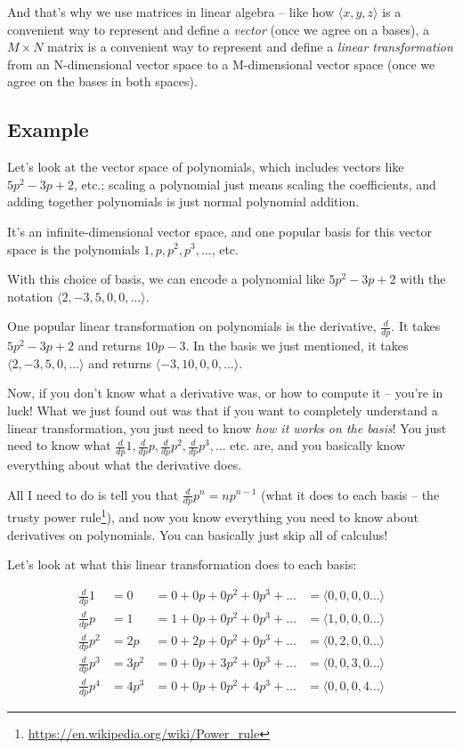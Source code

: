 \documentclass[]{article}
\renewcommand{\href}[2]{#2\footnote{\url{#1}}}
\begin{document}
And that's why we use matrices in linear algebra -- like how \(\langle x, y, z
\rangle\) is a convenient way to represent and define a \emph{vector} (once we
agree on a bases), a \(M \times N\) matrix is a convenient way to represent and
define a \emph{linear transformation} from an N-dimensional vector space to a
M-dimensional vector space (once we agree on the bases in both spaces).

\subsection{Example}\label{example}

Let's look at the vector space of polynomials, which includes vectors like \(5
p^2 - 3 p + 2\), etc.; scaling a polynomial just means scaling the coefficients,
and adding together polynomials is just normal polynomial addition.

It's an infinite-dimensional vector space, and one popular basis for this vector
space is the polynomials \(1, p, p^2, p^3, \ldots\), etc.

With this choice of basis, we can encode a polynomial like \(5 p^2 - 3 p + 2\)
with the notation \(\langle 2, -3, 5, 0, 0, \ldots \rangle\).

One popular linear transformation on polynomials is the derivative,
\(\frac{d}{dp}\). It takes \(5 p^2 - 3 p + 2\) and returns \(10 p - 3\). In the
basis we just mentioned, it takes \(\langle 2, -3, 5, 0, \ldots \rangle\) and
returns \(\langle -3, 10, 0, 0, \ldots \rangle\).

Now, if you don't know what a derivative was, or how to compute it -- you're in
luck! What we just found out was that if you want to completely understand a
linear transformation, you just need to know \emph{how it works on the basis}!
You just need to know what \(\frac{d}{dp} 1, \frac{d}{dp} p, \frac{d}{dp} p^2,
\frac{d}{dp} p^3, \ldots\) etc. are, and you basically know everything about
what the derivative does.

All I need to do is tell you that \(\frac{d}{dp} p^n = n p^{n - 1}\) (what it
does to each basis -- the trusty
\href{https://en.wikipedia.org/wiki/Power_rule}{power rule}), and now you know
everything you need to know about derivatives on polynomials. You can basically
just skip all of calculus!

Let's look at what this linear transformation does to each basis:

\[
\begin{aligned}
\frac{d}{dp} 1   & = 0     & = 0 + 0 p + 0 p^2 + 0 p^3 + \ldots
    & = \langle 0, 0, 0, 0 \ldots \rangle  \\
\frac{d}{dp} p   & = 1     & = 1 + 0 p + 0 p^2 + 0 p^3 + \ldots
    & = \langle 1, 0, 0, 0 \ldots \rangle  \\
\frac{d}{dp} p^2 & = 2 p   & = 0 + 2 p + 0 p^2 + 0 p^3 + \ldots
    & = \langle 0, 2, 0, 0 \ldots \rangle  \\
\frac{d}{dp} p^3 & = 3 p^2 & = 0 + 0 p + 3 p^2 + 0 p^3 + \ldots
    & = \langle 0, 0, 3, 0 \ldots \rangle  \\
\frac{d}{dp} p^4 & = 4 p^3 & = 0 + 0 p + 0 p^2 + 4 p^3 + \ldots
    & = \langle 0, 0, 0, 4 \ldots \rangle
\end{aligned}
\]
\end{document}

